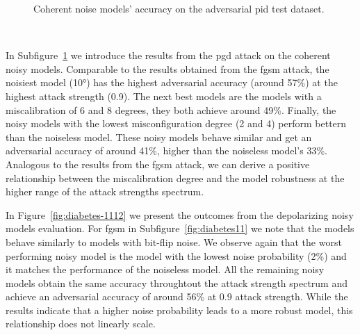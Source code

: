 \begin{figure}[!h]
\begin{subfigure}{0.45\textwidth}
      \label{fig:diabetes10}
  \end{subfigure}
  \caption{Coherent noise models' accuracy on the adversarial \ac{pid} test dataset.}
  \label{fig:diabetes-910}
\end{figure} \

In Subfigure~\ref{fig:diabetes10} we introduce the results from the \ac{pgd}
attack on the coherent noisy models. Comparable to the results obtained
from the \ac{fgsm} attack, the noisiest model (10°) has the highest adversarial
accuracy (around 57\%) at the highest attack strength (0.9). The next best
models are the models with a miscalibration of 6 and 8 degrees, they both
achieve around 49\%. Finally, the noisy models with the lowest misconfiguration
degree (2 and 4) perform bettern than the noiseless model. These noisy models
behave similar and get an adversarial accuracy of around 41\%, higher than
the noiseless model's 33\%. Analogous to the results from the \ac{fgsm}
attack, we can derive a positive relationship between the miscalibration
degree and the model robustness at the higher range of the attack strengths
spectrum.  \

In Figure~\ref{fig:diabetes-1112} we present the outcomes from the depolarizing
noisy models evaluation. For \ac{fgsm} in Subfigure~\ref{fig:diabetes11}
we note that the models behave similarly to models with bit-flip noise.
We observe again that the worst performing noisy model is the model with
the lowest noise probability (2\%) and it matches the performance of the
noiseless model. All the remaining noisy models obtain the same accuracy
throughtout the attack strength spectrum and achieve an adversarial
accuracy of around 56\% at 0.9 attack strength. While the results indicate
that a higher noise probability leads to a more robust model, this
relationship does not linearly scale. \

